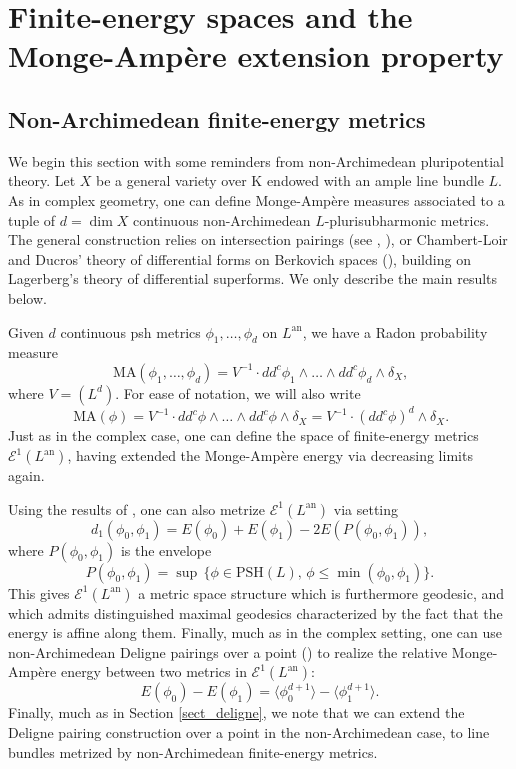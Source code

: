 \documentclass[JEP,XML,SOM,Unicode,NoEqCountersInSection,published]{cedram}
\theoremstyle{definition}
\newcommand\cE{\mathcal{E}}
\newcommand\K{\mathrm{K}}
\newcommand\mi{^{-1}}
\newcommand\an{^{\mathrm{an}}}
\newcommand\PSH{\mathrm{PSH}}
\newcommand\MA{\,\mathrm{MA}}
\begin{document}
\section{Finite-energy spaces and the Monge-Ampère extension property}\label{sect_sect3}

\subsection{Non-Archimedean finite-energy metrics}\label{sect_naenergy}

We begin this section with some reminders from non-Archimedean pluripotential theory. Let $X$ be a general variety over $\K$ endowed with an ample line bundle $L$. As in complex geometry, one can define Monge-Ampère measures associated to a tuple of $d=\dim X$ continuous non-Archimedean $L$-plurisubharmonic metrics. The general construction relies on intersection pairings (see \eg \cite{gublerinventionestropical}, \cite{be20}), or Chambert-Loir and Ducros' theory of differential forms on Berkovich spaces (\cite[5, 6]{cld}), building on Lagerberg's theory of differential superforms. We only describe the main results below.

Given $d$ continuous psh metrics $\phi_1,\dots,\phi_d$ on $L\an$, we have a Radon probability measure
\[
\MA(\phi_1,\dots,\phi_d)=V\mi\cdot dd^c\phi_1\wedge\dots\wedge dd^c\phi_d\wedge\delta_X,
\]
where $V=(L^d)$. For ease of notation, we will also write
\[
\MA(\phi)=V\mi\cdot dd^c\phi\wedge\dots\wedge dd^c\phi\wedge\delta_X=V\mi\cdot (dd^c\phi)^d\wedge\delta_X.
\]
Just as in the complex case, one can define the space of finite-energy metrics $\cE^1(L\an)$, having extended the Monge-Ampère energy via decreasing limits again.

Using the results of \cite{reb20b}, one can also metrize $\cE^1(L\an)$ via setting
\[
d_1(\phi_0,\phi_1)=E(\phi_0)+E(\phi_1)-2E(P(\phi_0,\phi_1)),
\]
where $P(\phi_0,\phi_1)$ is the envelope
\[
P(\phi_0,\phi_1)=\sup\,\{\phi\in \PSH(L),\,\phi\leq\min(\phi_0,\phi_1)\}.
\]
This gives $\cE^1(L\an)$ a metric space structure which is furthermore geodesic, and which admits distinguished maximal geodesics characterized by the fact that the energy is affine along them. Finally, much as in the complex setting, one can use non-Archimedean Deligne pairings over a point (\cite{be20}) to realize the relative Monge-Ampère energy between two metrics in $\cE^1(L\an)$:
\[
E(\phi_0)-E(\phi_1)=\langle \phi_0^{d+1}\rangle - \langle \phi_1^{d+1}\rangle.
\]
Finally, much as in Section \ref{sect_deligne}, we note that we can extend the Deligne pairing construction over a point in the non-Archimedean case, to line bundles metrized by non-Archimedean finite-energy metrics.
\end{document}

